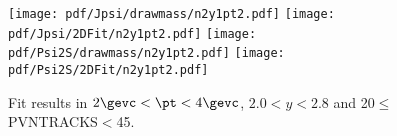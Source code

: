 \begin{figure}[H]
\begin{center}
\texttt{[image: pdf/Jpsi/drawmass/n2y1pt2.pdf]}
\texttt{[image: pdf/Jpsi/2DFit/n2y1pt2.pdf]}
\vspace*{-0.5cm}
\texttt{[image: pdf/Psi2S/drawmass/n2y1pt2.pdf]}
\texttt{[image: pdf/Psi2S/2DFit/n2y1pt2.pdf]}
\vspace*{-0.5cm}
\end{center}
\caption{Fit results in $2\gevc<\pt<4\gevc$, $2.0<y<2.8$ and 20$\leq$PVNTRACKS$<$45.}
\label{Fitn2y1pt2}
\end{figure}
